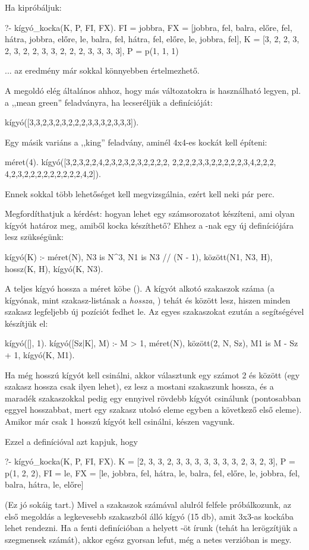 Ha kipróbáljuk:
\begin{query}
?- kígyó_kocka(K, P, FI, FX).
FI = jobbra,
FX = [jobbra, fel, balra, előre, fel, hátra, jobbra,
      előre, le, balra, fel, hátra, fel, előre, le,
      jobbra, fel],
K = [3, 2, 2, 3, 2, 3, 2, 2, 3, 3, 2, 2, 2, 3, 3, 3,
     3],
P = p(1, 1, 1)
\end{query}
... az eredmény már sokkal könnyebben értelmezhető.

A megoldó elég általános ahhoz, hogy más
változatokra is használható legyen, pl. a ,,mean
green'' feladványra, ha lecseréljük a 
definícióját:
\begin{program}
kígyó([3,3,2,3,2,3,2,2,2,3,3,3,2,3,3,3]).
\end{program}
Egy másik variáns a ,,king'' feladvány, aminél
4x4-es kockát kell építeni:
\begin{program}
méret(4).
kígyó([3,2,3,2,2,4,2,3,2,3,2,3,2,2,2,2,
       2,2,2,2,3,3,2,2,2,2,2,3,4,2,2,2,
       4,2,3,2,2,2,2,2,2,2,2,2,4,2]).
\end{program}
Ennek sokkal több lehetőséget kell megvizsgálnia,
ezért kell neki pár perc.

Megfordíthatjuk a kérdést: hogyan lehet egy
számsorozatot készíteni, ami olyan kígyót határoz
meg, amiből kocka készíthető? Ehhez a -nak
egy új definíciójára lesz szükségünk:
\begin{program}
kígyó(K) :-
    méret(N), N3 is N^3, N1 is N3 // (N - 1),
    között(N1, N3, H), hossz(K, H),
    kígyó(K, N3).
\end{program}
A teljes kígyó hossza a méret köbe (). A
kígyót alkotó szakaszok száma (a kígyónak, mint
szakasz-listának a \emph{hossza}, ) tehát
 és  között lesz, hiszen minden
szakasz legfeljebb  új pozíciót fedhet
le. Az egyes szakaszokat ezután a 
segítségével készítjük el:
\begin{program}
kígyó([], 1).
kígyó([Sz|K], M) :-
    M > 1, méret(N), között(2, N, Sz),
    M1 is M - Sz + 1, kígyó(K, M1).
\end{program}
Ha még  hosszú kígyót kell csinálni, akkor
választunk egy számot 2 és  között (egy
szakasz hossza csak ilyen lehet), ez lesz a mostani
szakaszunk hossza, és a maradék szakaszokkal pedig
egy ennyivel rövdebb kígyót csinálunk (pontosabban
eggyel hosszabbat, mert egy szakasz utolsó eleme
egyben a következő első eleme). Amikor már csak 1
hosszú kígyót kell csinálni, készen vagyunk.

Ezzel a definícióval azt kapjuk, hogy
\begin{query}
?- kígyó_kocka(K, P, FI, FX).
K = [2, 3, 3, 2, 3, 3, 3, 3, 3, 3, 3, 2, 3, 2, 3],
P = p(1, 2, 2),
FI = le,
FX = [le, jobbra, fel, hátra, le, balra, fel, előre,
      le, jobbra, fel, balra, hátra, le, előre] 
\end{query}
(Ez jó sokáig tart.) Mivel a szakaszok számával
alulról felfele próbálkozunk, az első megoldás a
legkevesebb szakaszból álló kígyó (15 db), amit
3x3-as kockába lehet rendezni. Ha a fenti
definícióban a  helyett -öt írunk (tehát ha lerögzítjük a szegmensek
számát), akkor egész gyorsan lefut, még a netes
verzióban is megy.

